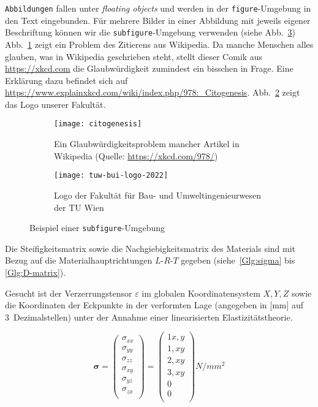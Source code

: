 %
\texttt{Abbildungen} fallen unter \emph{floating objects} und werden in der \texttt{figure}-Umgebung in den Text eingebunden.
Für mehrere Bilder in einer Abbildung mit jeweils eigener Beschriftung können wir die \texttt{subfigure}-Umgebung verwenden (siehe Abb.~\ref{fig:bsp-subfigure})
%
Abb.~\ref{fig:xkcd-citogenesis} zeigt ein Problem des Zitierens aus Wikipedia. 
Da manche Menschen alles glauben, was in Wikipedia geschrieben steht, stellt dieser Comik aus \url{https://xkcd.com} die Glaubwürdigkeit zumindest ein bisschen in Frage.
Eine Erklärung dazu befindet sich auf \url{https://www.explainxkcd.com/wiki/index.php/978:_Citogenesis}.
Abb.~\ref{fig:logo-fakultät} zeigt das Logo unserer Fakultät.
%
\begin{figure}[ht]
  \begin{subfigure}[t]{0.50\textwidth}
   \centering
   \texttt{[image: citogenesis]}
   \caption[Zitierproblematik]{Ein Glaubwürdigkeitsproblem mancher Artikel in Wikipedia (Quelle: \url{https://xkcd.com/978/})    \label{fig:xkcd-citogenesis}}
  \end{subfigure}
\hfill
  \begin{subfigure}[t]{0.45\textwidth}
   \centering
   \texttt{[image: tuw-bui-logo-2022]}
   \caption{Logo der Fakultät für Bau- und Umweltingenieurwesen der TU Wien \label{fig:logo-fakultät}}
  \end{subfigure}
\caption{Beispiel einer \texttt{subfigure}-Umgebung \label{fig:bsp-subfigure}}
\end{figure}
%


%
Die Steifigkeitsmatrix sowie die Nachgiebigkeitsmatrix des Materials sind mit Bezug auf die Materialhauptrichtungen $L$-$R$-$T$ gegeben (siehe~\eqref{Glg:sigma} bis \eqref{Glg:D-matrix}).

Gesucht ist der Verzerrungstensor $\varepsilon$ im globalen Koordinatensystem $X,Y,Z$ sowie die Koordinaten der Eckpunkte in der verformten Lage (angegeben in [\si{mm}] auf 3~Dezimalstellen) unter der Annahme einer linearisierten Elastizitätstheorie.

\begin{equation}
\boldsymbol{\sigma}
=
\left(
   \begin{array}{c}
      \sigma_{xx} \\
      \sigma_{yy} \\
      \sigma_{zz} \\
      \sigma_{xy} \\
      \sigma_{yz} \\
      \sigma_{zx} \\
   \end{array}
\right)
=
\left(
   \begin{array}{c}
      1x{,}y \\
      1{,}xy \\
      2{,}xy \\
      3{,}xy \\
      0      \\
      0      \\
   \end{array}
\right)
\si{N/mm^2}
\label{Glg:sigma}
\end{equation}

